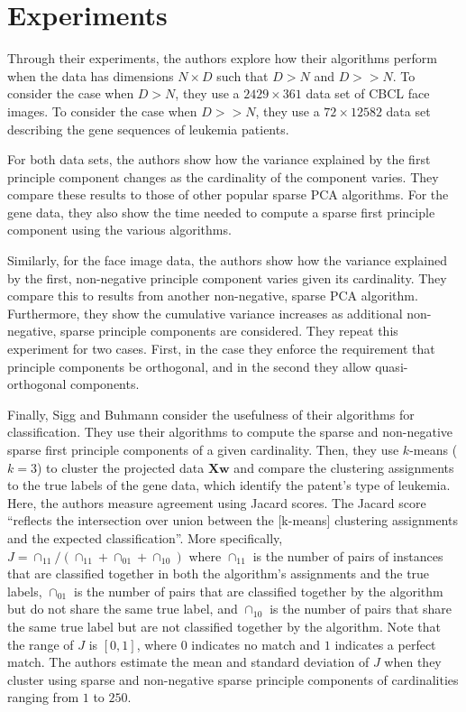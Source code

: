 \documentclass[twocolumn]{article}
\begin{document}
\section{Experiments}

Through their experiments, the authors explore how their algorithms perform
when the data has dimensions $N \times D$ such that $D > N$ and $D >> N$.
To consider the case when $D > N$, they use a $2429 \times 361$ data set
of CBCL face images.
To consider the case when $D >> N$, they use a $72 \times 12582$ data set
describing the gene sequences of leukemia patients.

For both data sets, the authors show how the variance explained by the first
principle component changes as the cardinality of the component varies.
They compare these results to those of other popular sparse PCA algorithms.
For the gene data, they also show the time needed to compute a sparse
first principle component using the various algorithms.

Similarly, for the face image data, the authors show how the variance
explained by the first, non-negative principle component varies given
its cardinality.
They compare this to results from another non-negative, sparse PCA algorithm.
Furthermore, they show the cumulative variance increases as additional
non-negative, sparse principle components are considered.
They repeat this experiment for two cases. First, in the case they enforce
the requirement that principle components be orthogonal, and in the second
they allow quasi-orthogonal components.

Finally, Sigg and Buhmann consider the usefulness of their algorithms
for classification. They use their algorithms to compute the sparse
and non-negative sparse first principle components of a given cardinality.
Then, they use $k$-means ($k=3$) to cluster the projected data $\mathbf{Xw}$
and compare the clustering assignments to the true labels of the gene data,
which identify the patent's type of leukemia.
Here, the authors measure agreement using Jacard scores.
The Jacard score ``reflects the intersection over union between the
[k-means] clustering assignments and the expected classification''.
More specifically, $J = \cap_{11} / (\cap_{11} + \cap_{01} + \cap_{10})$
where $\cap_{11}$ is the number of pairs of instances that are
classified together in both the algorithm's assignments and the true labels,
$\cap_{01}$ is the number of pairs that are classified together by the
algorithm but do not share the same true label, and $\cap_{10}$ is the
number of pairs that share the same true label but are not classified
together by the algorithm.
Note that the range of $J$ is $[0, 1]$, where $0$ indicates no match
and $1$ indicates a perfect match.
The authors estimate the mean and standard deviation of $J$ when they
cluster using sparse and non-negative sparse principle components
of cardinalities ranging from $1$ to $250$.
\end{document}
